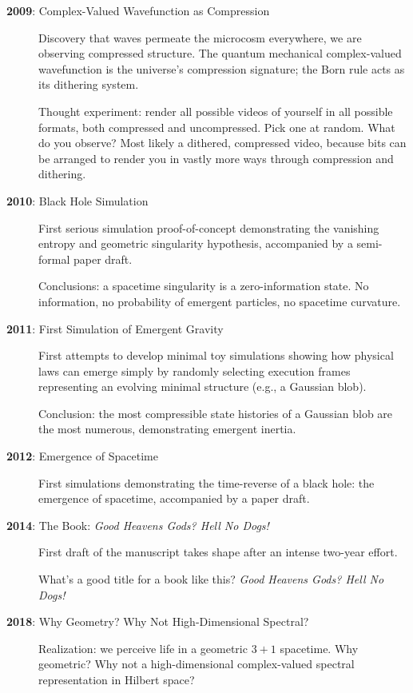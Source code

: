 \begin{description}
\item[\textbf{2009}: Complex-Valued Wavefunction as Compression]
  Discovery that waves permeate the microcosm everywhere, we are observing compressed structure. The quantum mechanical complex-valued wavefunction is the universe's compression signature; the Born rule acts as its dithering system.

  Thought experiment: render all possible videos of yourself in all possible formats, both compressed and uncompressed. Pick one at random. What do you observe? Most likely a dithered, compressed video, because bits can be arranged to render you in vastly more ways through compression and dithering.

\item[\textbf{2010}: Black Hole Simulation]
  First serious simulation proof-of-concept demonstrating the vanishing entropy and geometric singularity hypothesis, accompanied by a semi-formal paper draft.

  Conclusions: a spacetime singularity is a zero-information state. No information, no probability of emergent particles, no spacetime curvature.

\item[\textbf{2011}: First Simulation of Emergent Gravity]
  First attempts to develop minimal toy simulations showing how physical laws can emerge simply by randomly selecting execution frames representing an evolving minimal structure (e.g., a Gaussian blob).

  Conclusion: the most compressible state histories of a Gaussian blob are the most numerous, demonstrating emergent inertia.

\item[\textbf{2012}: Emergence of Spacetime]
  First simulations demonstrating the time-reverse of a black hole: the emergence of spacetime, accompanied by a paper draft.

\item[\textbf{2014}: The Book: \textit{Good Heavens Gods? Hell No Dogs!}]
  First draft of the manuscript takes shape after an intense two-year effort.

  What's a good title for a book like this? \textit{Good Heavens Gods? Hell No Dogs!}

\item[\textbf{2018}: Why Geometry? Why Not High-Dimensional Spectral?]
  Realization: we perceive life in a geometric $3+1$ spacetime. Why geometric? Why not a high-dimensional complex-valued spectral representation in Hilbert space?


\end{description}
